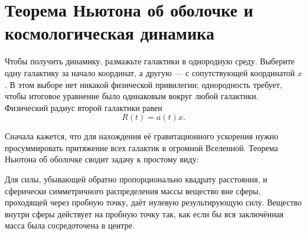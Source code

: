 \begin{classroomqa}
\end{classroomqa}

\begin{classroomqa}
\end{classroomqa}

\section{Теорема Ньютона об оболочке и космологическая динамика}

Чтобы получить динамику, размажьте галактики в однородную среду. Выберите одну галактику за начало координат, а другую — с сопутствующей координатой \(x\). В этом выборе нет никакой физической привилегии; однородность требует, чтобы итоговое уравнение было одинаковым вокруг любой галактики. Физический радиус второй галактики равен
\begin{equation}
  R(t)=a(t)x.
  \label{eq:radius-ax}
\end{equation}

Сначала кажется, что для нахождения её гравитационного ускорения нужно просуммировать притяжение всех галактик в огромной Вселенной. Теорема Ньютона об оболочке сводит задачу к простому виду:

\begin{proposition}
Для силы, убывающей обратно пропорционально квадрату расстояния, и сферически симметричного распределения массы вещество вне сферы, проходящей через пробную точку, даёт нулевую результирующую силу. Вещество внутри сферы действует на пробную точку так, как если бы вся заключённая масса была сосредоточена в центре.
\end{proposition}

